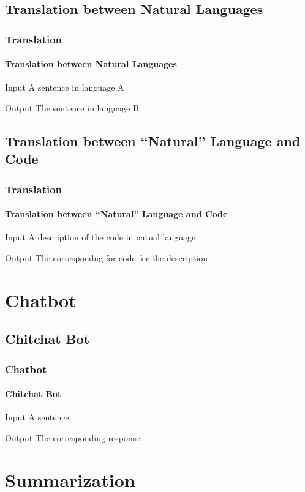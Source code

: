 \documentclass{beamer}
\begin{document}
\subsection{Translation between Natural Languages}
\begin{frame}
    \frametitle{Translation}
    \framesubtitle{Translation between Natural Languages}
    \begin{block}{Input}
        A sentence in language A
    \end{block}
    
    \begin{block}{Output}
        The sentence in language B
    \end{block}
\end{frame}

\subsection{Translation between ``Natural'' Language and Code}
\begin{frame}
    \frametitle{Translation}
    \framesubtitle{Translation between ``Natural'' Language and Code}
    \begin{block}{Input}
        A description of the code in natual language
    \end{block}
    
    \begin{block}{Output}
        The correspondng for code for the description
    \end{block}
\end{frame}

\section{Chatbot}
\subsection{Chitchat Bot}
\begin{frame}
    \frametitle{Chatbot}
    \framesubtitle{Chitchat Bot}
    \begin{block}{Input}
        A sentence
    \end{block}
    
    \begin{block}{Output}
        The corresponding response
    \end{block}
\end{frame}

\section{Summarization}
\end{document}
